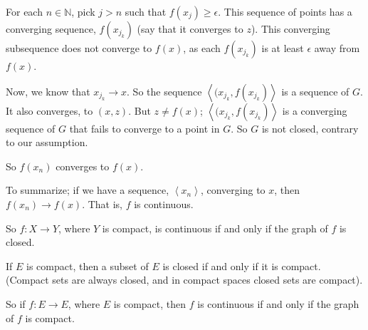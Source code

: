 \documentclass[a4paper,12pt]{article}
\newcommand{\tab}{\hspace{4mm}} %
\newcommand{\shunt}{\vspace{20mm}}
\newcommand{\anbrack}[1]{\left\langle #1 \right\rangle}
\newcommand{\ep}{\epsilon}
\newcommand{\N}{\mathbb{N}}
\begin{document}
\tab \tab For each $n \in \N$, pick $j >n$ such that $f(x_j) \geq \ep$. This sequence of points has a converging sequence, $f(x_{j_k})$ (say that it converges to $z$). This converging subsequence does not converge to $f(x)$, as each $f(x_{j_k})$ is at least $\ep$ away from $f(x)$.

\tab \tab Now, we know that $x_{j_k} \to x$. So the sequence $\anbrack{(x_{j_k},f(x_{j_k})}$ is a sequence of $G$. It also converges, to $(x,z)$. But $z \neq f(x)$; $\anbrack{(x_{j_k},f(x_{j_k})}$ is a converging sequence of $G$ that fails to converge to a point in $G$. So $G$ is not closed, contrary to our assumption.

\tab So $f(x_n)$ converges to $f(x)$.

\tab To summarize; if we have a sequence, $\anbrack{x_n}$, converging to $x$, then $f(x_n) \to f(x)$. That is, $f$ is continuous.

So $f: X \to Y$, where $Y$ is compact, is continuous if and only if the graph of $f$ is closed.

If $E$ is compact, then a subset of $E$ is closed if and only if it is compact. (Compact sets are always closed, and in compact spaces closed sets are compact).

So if $f: E \to E$, where $E$ is compact, then $f$ is continuous if and only if the graph of $f$ is compact.

\shunt
\end{document}
